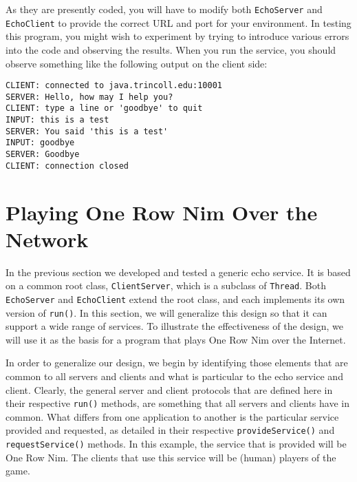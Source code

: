 {\noindent As they are presently coded, you will have to modify both
{\tt EchoServer} and {\tt EchoClient} to provide the correct URL and port
for your environment.  In testing this program, you might wish to
experiment by trying to introduce various errors into the code and
observing the results.  When you run the service, you should observe
something like the following output on the client side:

\begin{jjjlisting}
\begin{lstlisting}
CLIENT: connected to java.trincoll.edu:10001
SERVER: Hello, how may I help you?
CLIENT: type a line or 'goodbye' to quit
INPUT: this is a test
SERVER: You said 'this is a test'
INPUT: goodbye
SERVER: Goodbye
CLIENT: connection closed
\end{lstlisting}
\end{jjjlisting}

\section{Playing One Row Nim Over the Network}
\label{playing-one-row-nim-overthe-network}

\noindent In the previous section we developed and tested a generic echo service.  
It is based on a common root class, {\tt ClientServer}, which is a subclass of
{\tt Thread}.  Both {\tt EchoServer} and {\tt EchoClient} extend the
root class, and each implements its own version of {\tt run()}. In
this section, we will generalize this design so that it can support a wide
range of services.  To illustrate the effectiveness of the design, we
will use it as the basis for a program that plays One Row Nim over the
Internet.

In order to generalize our design, we begin by identifying
those elements that are common to all
servers and clients and what is particular to the echo service and
client.  Clearly, the general server and client protocols that are defined
here in their respective {\tt run()} methods, are something that all
servers and clients have in common.  What differs from one application
to another is the particular service provided and requested, as
detailed in their respective {\tt provideService()} and {\tt
requestService()} methods. In this example, the service that is
provided will be One Row Nim.  The clients that use this service will
be (human) players of the game.

}
